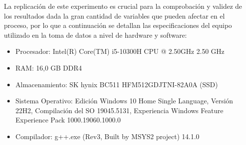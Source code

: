 
La replicación de este experimento es crucial para la comprobación y validez de los resultados dada la gran cantidad de variables que pueden afectar en el proceso, por lo que a continuación se detallan las especificaciones del equipo utilizado en la toma de datos a nivel de hardware y software:

\begin{itemize}
    \item Procesador: Intel(R) Core(TM) i5-10300H CPU @ 2.50GHz 2.50 GHz
    \item RAM: 16,0 GB DDR4
    \item Almacenamiento: SK hynix BC511 HFM512GDJTNI-82A0A (SSD)
    \item Sistema Operativo: Edición Windows 10 Home Single Language, Versión	22H2, Compilación del SO 19045.5131, Experiencia Windows Feature Experience Pack 1000.19060.1000.0
    \item Compilador: g++.exe (Rev3, Built by MSYS2 project) 14.1.0
\end{itemize}